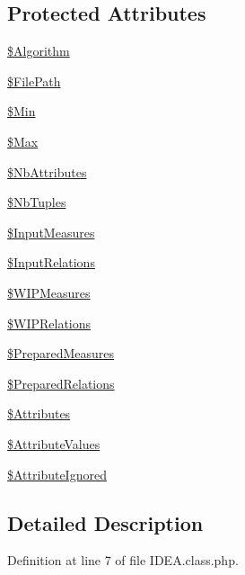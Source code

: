 \subsection*{Protected Attributes}
\begin{DoxyCompactItemize}
\item 
\hyperlink{class_i_d_e_a_ad74a0fd1ee627e726e9e91bec202762d}{\$\+Algorithm}
\item 
\hyperlink{class_i_d_e_a_ad4594c431fac6bb709ca4580e0cc3a79}{\$\+File\+Path}
\item 
\hyperlink{class_i_d_e_a_a244336f501ccb9f0a5e19d3bf37ad1fe}{\$\+Min}
\item 
\hyperlink{class_i_d_e_a_a06bb80e4eae38c480f7565933dbaa0e2}{\$\+Max}
\item 
\hyperlink{class_i_d_e_a_afd227a7f13bbe3e5ee4863de2eaccc71}{\$\+Nb\+Attributes}
\item 
\hyperlink{class_i_d_e_a_af45a0a52cadbdff3e7fb7f9439c99b81}{\$\+Nb\+Tuples}
\item 
\hyperlink{class_i_d_e_a_a3a0bf30dc74cfde747e27c8108734dbf}{\$\+Input\+Measures}
\item 
\hyperlink{class_i_d_e_a_a318b690112e2ef19e7c3bac38a1fc532}{\$\+Input\+Relations}
\item 
\hyperlink{class_i_d_e_a_a8a5aab2bad73a34c95800e0b77a3f269}{\$\+W\+I\+P\+Measures}
\item 
\hyperlink{class_i_d_e_a_af2e84c13149d37d555f8d18b3829323b}{\$\+W\+I\+P\+Relations}
\item 
\hyperlink{class_i_d_e_a_aa5836cbb2cc3e6a5a33d253ea53cdfbb}{\$\+Prepared\+Measures}
\item 
\hyperlink{class_i_d_e_a_a2b6367c53872f5faf8d46ccce5d4f7b2}{\$\+Prepared\+Relations}
\item 
\hyperlink{class_i_d_e_a_a517ffdcebcf46972beaff189c9822f37}{\$\+Attributes}
\item 
\hyperlink{class_i_d_e_a_af5b1e899c98be9cb757580aea7cdbe1a}{\$\+Attribute\+Values}
\item 
\hyperlink{class_i_d_e_a_ac100e401de2c70a9ebb25623a028b12a}{\$\+Attribute\+Ignored}
\end{DoxyCompactItemize}


\subsection{Detailed Description}


Definition at line 7 of file I\+D\+E\+A.\+class.\+php.



